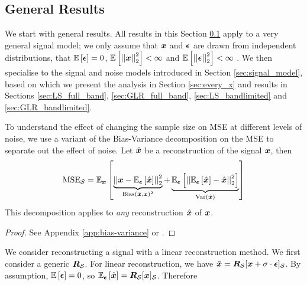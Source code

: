 
\subsection{General Results}
\label{sec:general}
{\color{black}








We start with general results. All results in this Section \ref{sec:general} apply to a very general signal model; we only assume that $\bm{x}$ and $\bm{\epsilon}$ are drawn from independent distributions, that $\expect{\vect{\epsilon}} = 0$, $\expect{\sqnormvec{\vect{x}}} < \infty$ and $\expect{\sqnormvec{\vect{\epsilon}}} < \infty$ . We then specialise to the signal and noise models introduced in Section \ref{sec:signal_model}, based on which we present the analysis in Section \ref{sec:every_x} and results in Sections \ref{sec:LS_full_band}, \ref{sec:GLR_full_band}, \ref{sec:LS_bandlimited} and \ref{sec:GLR_bandlimited}.

To understand the effect of changing the sample size on MSE at different levels of noise, we use a variant of the Bias-Variance decomposition  \cite{geman1992neural} on the MSE to separate out the effect of noise. Let $\hat{\bm{x}}$ be a reconstruction of the signal $\bm{x}$, then
\begin{equation}
    \textrm{MSE}_{\set{S}} = \expect[\vect{x}]{\underbrace{\sqnormvec{\vect{x} - \expect[\vect{\epsilon}]{\hat{\vect{x}}}}}_{\text{Bias}(\hat{\vect{x}},\vect{x})^{2}} + \underbrace{\expect[\vect{\epsilon}]{\sqnormvec{ \expect[\vect{\epsilon}]{\hat{\vect{x}}} - \hat{\vect{x}}}}}_{\text{Var}(\hat{\vect{x}})}} \label{eq:Bias_var_decomp_general}
\end{equation}
This decomposition applies to \emph{any} reconstruction $\hat{\bm{x}}$ of $\bm{x}$.
\begin{proof}
    See Appendix \ref{app:bias-variance} or \cite[Chapter 5.4.4]{Goodfellow2016DeepLearning}.
\end{proof}
}
We consider reconstructing a signal with a linear reconstruction method. We first consider a generic $\bm{R}_{\mathcal{S}}$. 
\noindent For linear reconstruction, we have $\hat{\vect{x}} = \matr{R}_{\set{S}}\vectsubgen[\set{S}]{\vect{x} + \sigma \cdot \vect{\epsilon}}$. By assumption, $\expect{\vect{\epsilon}} = 0$, so $\expect[\vect{\epsilon}]{\hat{\vect{x}}} = \matr{R}_{\set{S}}\vectsub[S]{x}$. Therefore
